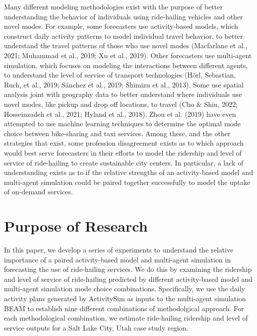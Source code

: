\documentclass[fancy, masters]{byuthesis}
\begin{document}
Many different modeling methodologies exist with the purpose of better understanding the behavior of individuals using ride-hailing vehicles and other novel modes. For example, some forecasters use activity-based models, which construct daily activity patterns to model individual travel behavior, to better understand the travel patterns of those who use novel modes (Macfarlane et al., 2021; Muhammad et al., 2019; Xu et al., 2019). Other forecasters use multi-agent simulation, which focuses on modeling the interactions between different agents, to understand the level of service of transport technologies (Hörl, Sebastian, Ruch, et al., 2019; Sánchez et al., 2019; Shimizu et al., 2013). Some use spatial analysis joint with geography data to better understand where individuals use novel modes, like pickup and drop off locations, to travel (Cho \& Shin, 2022; Hosseinzadeh et al., 2021; Hyland et al., 2018). Zhou et al. (2019) have even attempted to use machine learning techniques to determine the optimal mode choice between bike-sharing and taxi services. Among these, and the other strategies that exist, some profession disagreement exists as to which approach would best serve forecasters in their efforts to model the ridership and level of service of ride-hailing to create sustainable city centers. In particular, a lack of understanding exists as to if the relative strengths of an activity-based model and multi-agent simulation could be paired together successfully to model the uptake of on-demand services.

\hypertarget{purpose-of-research}{%
\section{Purpose of Research}\label{purpose-of-research}}

In this paper, we develop a series of experiments to understand the relative importance of a paired activity-based model and multi-agent simulation in forecasting the use of ride-hailing services. We do this by examining the ridership and level of service of ride-hailing predicted by different activity-based model and multi-agent simulation mode choice combinations. Specifically, we use the daily activity plans generated by ActivitySim as inputs to the multi-agent simulation BEAM to establish nine different combinations of methodolgical approach. For each methodological combination, we estimate ride-hailing ridership and level of service outputs for a Salt Lake City, Utah case study region.
\end{document}
